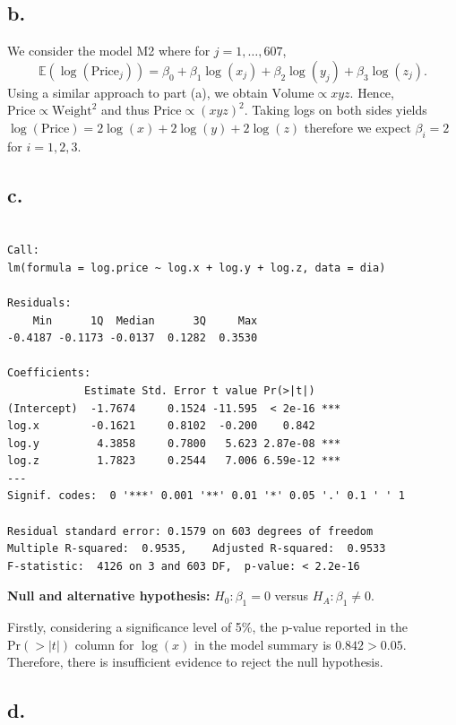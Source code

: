 \documentclass[
  11pt,
]{article}
\begin{document}
\subsection{b.}\label{b.}

We consider the model M2 where for \(j = 1, \dots, 607\), \[
  \mathbb{E}(\log(\text{Price}_j)) = \beta_0 + \beta_1 \log(x_j) + \beta_2 \log(y_j) + \beta_3 \log(z_j).
\] Using a similar approach to part (a), we obtain
\(\text{Volume} \propto xyz\). Hence,
\(\text{Price} \propto \text{Weight}^2\) and thus
\(\text{Price} \propto (xyz)^2\). Taking logs on both sides yields
\(\log(\text{Price}) = 2\log(x) + 2\log(y) + 2\log(z)\) therefore we
expect \(\beta_i = 2\) for \(i = 1, 2, 3\).

\subsection{c.}\label{c.}

\begin{verbatim}

Call:
lm(formula = log.price ~ log.x + log.y + log.z, data = dia)

Residuals:
    Min      1Q  Median      3Q     Max 
-0.4187 -0.1173 -0.0137  0.1282  0.3530 

Coefficients:
            Estimate Std. Error t value Pr(>|t|)    
(Intercept)  -1.7674     0.1524 -11.595  < 2e-16 ***
log.x        -0.1621     0.8102  -0.200    0.842    
log.y         4.3858     0.7800   5.623 2.87e-08 ***
log.z         1.7823     0.2544   7.006 6.59e-12 ***
---
Signif. codes:  0 '***' 0.001 '**' 0.01 '*' 0.05 '.' 0.1 ' ' 1

Residual standard error: 0.1579 on 603 degrees of freedom
Multiple R-squared:  0.9535,    Adjusted R-squared:  0.9533 
F-statistic:  4126 on 3 and 603 DF,  p-value: < 2.2e-16
\end{verbatim}

\textbf{Null and alternative hypothesis:} \(H_0: \beta_1 = 0\) versus
\(H_A: \beta_1 \neq 0\).

Firstly, considering a significance level of 5\%, the p-value reported
in the \(\mathrm{Pr}(>|t|)\) column for \(\log(x)\) in the model summary
is \(0.842 > 0.05\). Therefore, there is insufficient evidence to reject
the null hypothesis.

\subsection{d.~}\label{d.}
\end{document}
